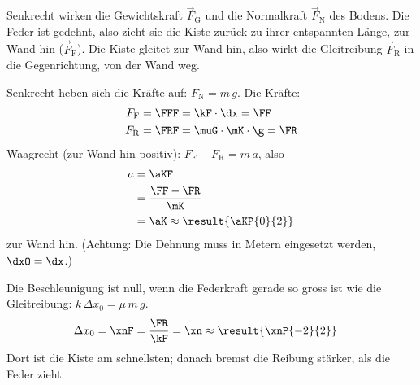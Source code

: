 \begin{abcliste}
\abc
Senkrecht wirken die Gewichtskraft $\vec F_\mathrm{G}$ und die Normalkraft $\vec F_\mathrm{N}$ des Bodens. Die Feder ist gedehnt, also zieht sie die Kiste zurück zu ihrer entspannten Länge, zur Wand hin ($\vec F_\mathrm{F}$). Die Kiste gleitet zur Wand hin, also wirkt die Gleitreibung $\vec F_\mathrm{R}$ in die Gegenrichtung, von der Wand weg.
\begin{center}
\end{center}

\abc
Senkrecht heben sich die Kräfte auf: $F_\mathrm{N} = m\,g$. Die Kräfte:
\begin{align}
 F_\mathrm{F} &= \FFF = \kF\cdot\dx = \FF \\
 F_\mathrm{R} &= \FRF = \muG\cdot\mK\cdot\g = \FR
\end{align}
Waagrecht (zur Wand hin positiv): $F_\mathrm{F} - F_\mathrm{R} = m\,a$, also
\begin{align}
 a &= \aKF \\
   &= \frac{\FF-\FR}{\mK} \\
   &= \aK \approx \result{\aKP{0}{2}}
\end{align}
zur Wand hin. (Achtung: Die Dehnung muss in Metern eingesetzt werden, $\dxO = \dx$.)

\abc
Die Beschleunigung ist null, wenn die Federkraft gerade so gross ist wie die Gleitreibung: $k\,\Delta x_0 = \mu\,m\,g$.
\begin{align}
 \Delta x_0 &= \xnF = \frac{\FR}{\kF} = \xn \approx \result{\xnP{-2}{2}}
\end{align}
Dort ist die Kiste am schnellsten; danach bremst die Reibung stärker, als die Feder zieht.
\end{abcliste}
